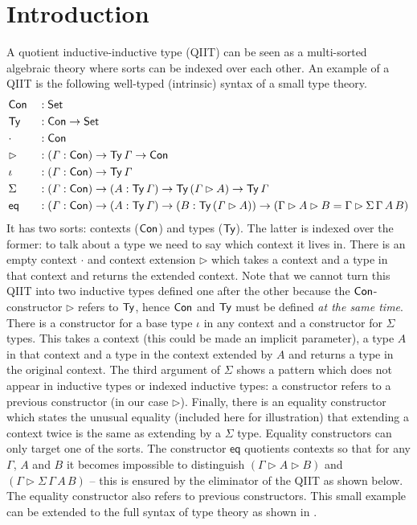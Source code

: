 \documentclass[acmsmall,screen]{acmart}
\begin{document}
\section{Introduction}

\label{sec:intro}

A quotient inductive-inductive type (QIIT) can be seen as a
multi-sorted algebraic theory where sorts can be indexed over each
other. An example of a QIIT is the following well-typed (intrinsic)
syntax of a small type theory.
\begin{alignat*}{5}
  & \mathsf{Con} && : \mathsf{Set} \\
  & \mathsf{Ty} && : \mathsf{Con}\rightarrow\mathsf{Set} \\
  & \cdot && : \mathsf{Con} \\
  & \rhd && : (\mathit{\Gamma}:\mathsf{Con})\rightarrow\mathsf{Ty}\,\mathit{\Gamma}\rightarrow\mathsf{Con} \\
  & \iota && : (\mathit{\Gamma}:\mathsf{Con})\rightarrow\mathsf{Ty}\,\mathit{\Gamma} \\
  & \Sigma && : (\mathit{\Gamma}:\mathsf{Con})\rightarrow(A:\mathsf{Ty}\,\mathit{\Gamma})\rightarrow\mathsf{Ty}\,(\mathit{\Gamma}\rhd A)\rightarrow\mathsf{Ty}\,\mathit{\Gamma} \\
  & \mathsf{eq} && : (\mathit{\Gamma}:\mathsf{Con})\rightarrow(A:\mathsf{Ty}\,\mathit{\Gamma})\rightarrow(B:\mathsf{Ty}\,(\mathit{\Gamma}\rhd A))\rightarrow (\Gamma\rhd A \rhd B = \Gamma\rhd \Sigma\,\Gamma\,A\,B)
\end{alignat*}
It has two sorts: contexts ($\mathsf{Con}$) and types ($\mathsf{Ty}$). The latter is
indexed over the former: to talk about a type we need to say which
context it lives in. There is an empty context $\cdot$ and context
extension $\rhd$ which takes a context and a type in that context and
returns the extended context. Note that we cannot turn this QIIT into
two inductive types defined one after the other because the
$\mathsf{Con}$-constructor $\rhd$ refers to $\mathsf{Ty}$, hence $\mathsf{Con}$ and $\mathsf{Ty}$ must
be defined \emph{at the same time}. There is a constructor for a base
type $\iota$ in any context and a constructor for $\Sigma$ types. This
takes a context (this could be made an implicit parameter), a type $A$
in that context and a type in the context extended by $A$ and returns
a type in the original context. The third argument of $\Sigma$ shows a
pattern which does not appear in inductive types or indexed inductive
types: a constructor refers to a previous constructor (in our case
$\rhd$). Finally, there is an equality constructor which states the
unusual equality (included here for illustration) that extending a
context twice is the same as extending by a $\Sigma$ type. Equality
constructors can only target one of the sorts. The constructor
$\mathsf{eq}$ quotients contexts so that for any $\Gamma$, $A$ and $B$
it becomes impossible to distinguish $(\Gamma\rhd A \rhd B)$ and
$(\Gamma\rhd \Sigma\,\Gamma\,A\,B)$ -- this is ensured by the
eliminator of the QIIT as shown below. The equality constructor also
refers to previous constructors. This small example can be extended to
the full syntax of type theory as shown in \cite{ttintt}.
\end{document}
